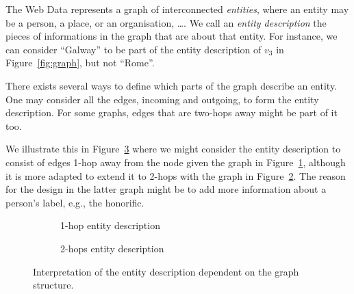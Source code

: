 The Web Data represents a graph of interconnected \emph{entities}, where an entity may be a person, a place, or an organisation, \ldots. We call an \emph{entity description} the pieces of informations in the graph that are about that entity. For instance, we can consider ``Galway'' to be part of the entity description of $v_3$ in Figure~\ref{fig:graph}, but not ``Rome''.

There exists several ways to define which parts of the graph describe an entity. One may consider all the edges, incoming and outgoing, to form the entity description. For some graphs, edges that are two-hops away might be part of it too.

We illustrate this in Figure~\ref{fig:edesc} where we might consider the entity description to consist of edges 1-hop away from the node given the graph in Figure~\ref{fig:edesc1}, although it is more adapted to extend it to 2-hops with the graph in Figure~\ref{fig:edesc2}. The reason for the design in the latter graph might be to add more information about a person's label, e.g., the honorific.

\begin{figure}
	\centering
	\begin{subfigure}[b]{.45\textwidth}
		\resizebox{.6\textwidth}{!}{
			
		}
		\caption{1-hop entity description}
		\label{fig:edesc1}
	\end{subfigure}
	\quad
	\begin{subfigure}[b]{.45\textwidth}
		\resizebox{\textwidth}{!}{
			
		}
		\caption{2-hops entity description}
		\label{fig:edesc2}
	\end{subfigure}
	\caption{Interpretation of the entity description dependent on the graph structure.}
	\label{fig:edesc}
\end{figure}

%

